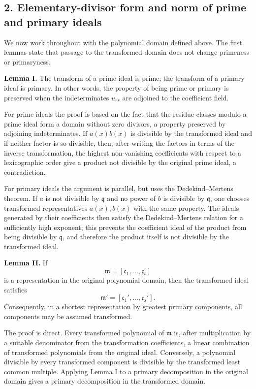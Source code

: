 \documentclass[11pt]{article}
\begin{document}
\subsection{2. Elementary-divisor form and norm of prime and primary ideals}

We now work throughout with the polynomial domain defined above. The first lemmas state that passage to the transformed domain does not change primeness or primaryness.

\textbf{Lemma I.} The transform of a prime ideal is prime; the transform of a primary ideal is primary. In other words, the property of being prime or primary is preserved when the indeterminates $u_{rs}$ are adjoined to the coefficient field.

For prime ideals the proof is based on the fact that the residue classes modulo a prime ideal form a domain without zero divisors, a property preserved by adjoining indeterminates. If $a(x)b(x)$ is divisible by the transformed ideal and if neither factor is so divisible, then, after writing the factors in terms of the inverse transformation, the highest non-vanishing coefficients with respect to a lexicographic order give a product not divisible by the original prime ideal, a contradiction.

For primary ideals the argument is parallel, but uses the Dedekind--Mertens theorem. If $a$ is not divisible by $\mathfrak q$ and no power of $b$ is divisible by $\mathfrak q$, one chooses transformed representatives $a(x),b(x)$ with the same property. The ideals generated by their coefficients then satisfy the Dedekind--Mertens relation for a sufficiently high exponent; this prevents the coefficient ideal of the product from being divisible by $\mathfrak q$, and therefore the product itself is not divisible by the transformed ideal.

\textbf{Lemma II.} If
\[
  \mathfrak m=[\mathfrak c_1,\ldots,\mathfrak c_s]
\]
is a representation in the original polynomial domain, then the transformed ideal satisfies
\[
  \mathfrak m'=[\mathfrak c_1',\ldots,\mathfrak c_s'].
\]
Consequently, in a shortest representation by greatest primary components, all components may be assumed transformed.

The proof is direct. Every transformed polynomial of $\mathfrak m$ is, after multiplication by a suitable denominator from the transformation coefficients, a linear combination of transformed polynomials from the original ideal. Conversely, a polynomial divisible by every transformed component is divisible by the transformed least common multiple. Applying Lemma I to a primary decomposition in the original domain gives a primary decomposition in the transformed domain.
\end{document}
